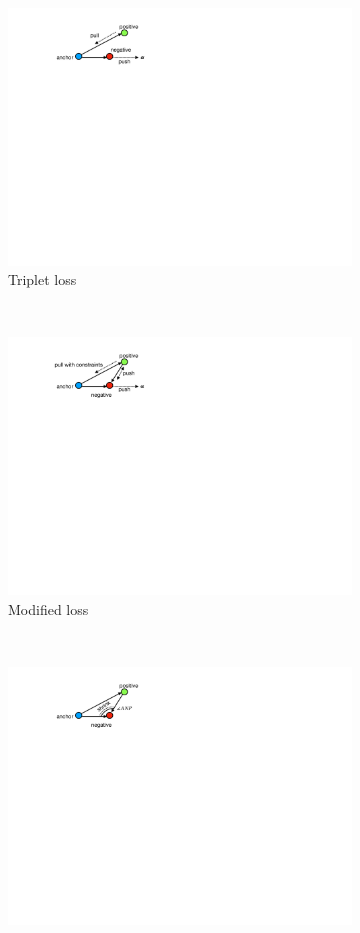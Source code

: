 \begin{figure}[htb]
    \centering
    \begin{subfigure}[t]{0.23\textwidth}
        \centering
        \includegraphics[width=.9\linewidth]{schroff_triplet}
        \caption{Triplet loss}
        \label{schroff_loss}
    \end{subfigure}%
    ~ 
    \begin{subfigure}[t]{0.23\textwidth}
        \centering 
        \includegraphics[width=.9\linewidth]{modified_loss}
        \caption{Modified loss}
        \label{modified_loss}
    \end{subfigure}
    ~ 
    \begin{subfigure}[t]{0.23\textwidth}
        \centering 
        \includegraphics[width=.9\linewidth]{angular_loss}

\end{subfigure}
\end{figure}
